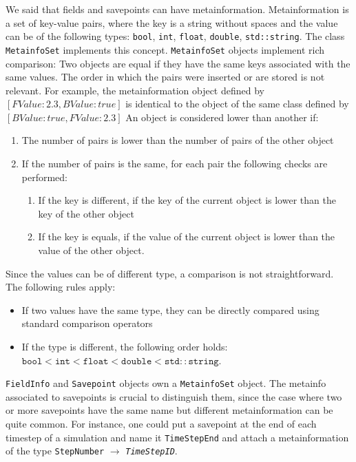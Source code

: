 \documentclass[a4paper,10pt]{article}
\begin{document}
We said that fields and savepoints can have metainformation. Metainformation is 
a set of key-value pairs, where the key is a string without spaces and the 
value can be of the following types: \texttt{bool}, \texttt{int}, 
\texttt{float}, \texttt{double}, \texttt{std::string}. The class 
\texttt{MetainfoSet} implements this concept. \texttt{MetainfoSet} objects 
implement rich comparison: Two objects are equal if they have the same keys 
associated with the same values. The order in which the pairs were inserted or 
are stored is not relevant. For example, the metainformation object defined by
$ \left[ FValue:2.3 , BValue:true \right]$
is identical to the object of the same class defined by
$\left[ BValue:true , FValue:2.3 \right]$
An object is considered lower than another if:

\begin{enumerate}
 \item The number of pairs is lower than the number of pairs of the other object
 \item If the number of pairs is the same, for each pair the following checks 
are performed:
    \begin{enumerate}
    \item If the key is different, if the key of the current object is lower 
than the key of the other object
    \item If the key is equals, if the value of the current object is lower 
than the value of the other object.
    \end{enumerate}

\end{enumerate}

Since the values can be of different type, a comparison is not straightforward. 
The following rules apply:

\begin{itemize}
 \item If two values have the same type, they can be directly compared using 
standard comparison operators
 \item If the type is different, the following order holds: \\
       $\mathtt{bool} < \mathtt{int} < \mathtt{float} < \mathtt{double} < 
\mathtt{std::string}$.
\end{itemize}

\texttt{FieldInfo} and \texttt{Savepoint} objects own a \texttt{MetainfoSet} 
object. The metainfo associated to savepoints is crucial to distinguish them, 
since the case where two or more savepoints have the same name but different 
metainformation can be quite common. For instance, one could put a savepoint at 
the end of each timestep of a simulation and name it \texttt{TimeStepEnd} and 
attach a metainformation of the type \texttt{StepNumber} $\rightarrow$ 
\texttt{\textit{TimeStepID}}.
\end{document}
